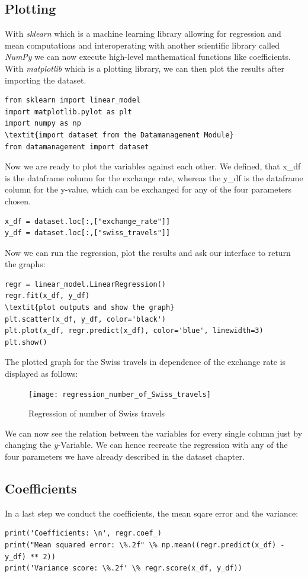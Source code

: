\documentclass[12pt,a4paper,bibliography=totocnumbered,listof=totocnumbered]{scrartcl}
\begin{document}
\subsection{Plotting}
With \textit{sklearn} which is a machine learning library allowing for regression and mean computations and interoperating with another scientific library called \textit{NumPy} we can now execute high-level mathematical functions like coefficients. With \textit{matplotlib} which is a plotting library, we can then plot the results after importing the dataset. 

\begin{verbatim}
from sklearn import linear_model
import matplotlib.pylot as plt
import numpy as np
\textit{import dataset from the Datamanagement Module}
from datamanagement import dataset
\end{verbatim}

Now we are ready to plot the variables against each other. We defined, that x_df is the dataframe column for the exchange rate, whereas the y_df is the dataframe column for the y-value, which can be exchanged for any of the four parameters chosen. 
\begin{verbatim}
x_df = dataset.loc[:,["exchange_rate"]]
y_df = dataset.loc[:,["swiss_travels"]]
\end{verbatim}


Now we can run the regression, plot the results and ask our interface to return the graphs:
\begin{verbatim}
regr = linear_model.LinearRegression()
regr.fit(x_df, y_df)
\textit{plot outputs and show the graph}
plt.scatter(x_df, y_df, color='black')
plt.plot(x_df, regr.predict(x_df), color='blue', linewidth=3)
plt.show()
\end{verbatim}

The plotted graph for the Swiss travels in dependence of the exchange rate is displayed as follows: 
\begin{figure}[htbp] 
  \centering
     \texttt{[image: regression\_number\_of\_Swiss\_travels]}
  \caption{Regression of number of Swiss travels}
  \label{fig: figure3}
\end{figure}
We can now see the relation between the variables for every single column just by changing the \textit{y}-Variable. We can hence recreate the regression with any of the four parameters we have already described in the dataset chapter. 

\subsection{Coefficients}
In a last step we conduct the coefficients, the mean sqare error and the variance:
\begin{verbatim}
print('Coefficients: \n', regr.coef_)
print("Mean squared error: \%.2f" \% np.mean((regr.predict(x_df) - y_df) ** 2))
print('Variance score: \%.2f' \% regr.score(x_df, y_df))
\end{verbatim}
\end{document}
